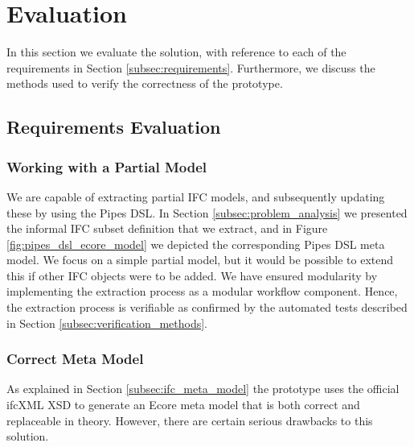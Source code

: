 \section{Evaluation}
\label{sec:evaluation}
In this section we evaluate the solution, with reference to each of the requirements in Section \ref{subsec:requirements}. Furthermore, we discuss the methods used to verify the correctness of the prototype.


\subsection{Requirements Evaluation}
\label{subsec:requirements_evaluation}
\subsubsection{Working with a Partial Model}
We are capable of extracting partial IFC models, and subsequently updating these by using the Pipes DSL. In Section \ref{subsec:problem_analysis} we presented the informal IFC subset definition that we extract, and in Figure \ref{fig:pipes_dsl_ecore_model} we depicted the corresponding Pipes DSL meta model. We focus on a simple partial model, but it would be possible to extend this if other IFC objects were to be added. We have ensured modularity by implementing the extraction process as a modular workflow component. Hence, the extraction process is verifiable as confirmed by the automated tests described in Section \ref{subsec:verification_methods}.

\subsubsection{Correct Meta Model} As explained in Section \ref{subsec:ifc_meta_model} the prototype uses the official ifcXML XSD to generate an Ecore meta model that is both correct and replaceable in theory. However, there are certain serious drawbacks to this solution.

